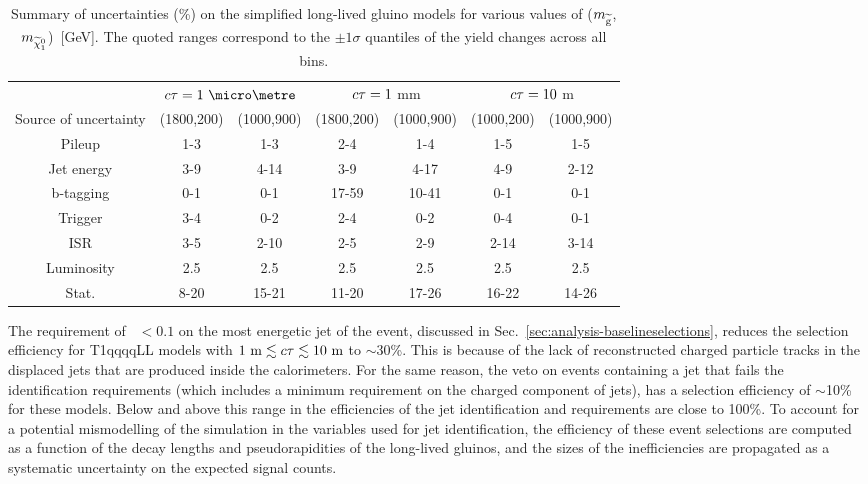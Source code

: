 \begin{table}[t]
\centering
\footnotesize
\begin{tabular}{c|cc|cc|cc}
\hline
& \multicolumn{2}{c|}{$\ctau=1~\micro\metre$} & \multicolumn{2}{c|}{$c\tau=1$ 
mm} & \multicolumn{2}{c}{$c\tau=10$ m} \\
Source of uncertainty & (1800,200) & (1000,900) & (1800,200) & 
(1000,900) & (1000,200) & (1000,900) \\   
\hline
Pileup & 1-3 & 1-3 & 2-4 & 1-4 & 1-5 & 1-5 \\
Jet energy & 3-9 & 4-14 & 3-9 & 4-17 & 4-9 & 2-12 \\
b-tagging & 0-1 & 0-1 & 17-59 & 10-41 & 0-1 & 0-1 \\
Trigger & 3-4 & 0-2 & 2-4 & 0-2 & 0-4 & 0-1 \\
ISR & 3-5 & 2-10 & 2-5 & 2-9 & 2-14 & 3-14 \\
Luminosity & 2.5 & 2.5 & 2.5 & 2.5 & 2.5 & 2.5 \\
Stat. & 8-20 & 15-21 & 11-20 & 17-26 & 16-22 & 14-26 \\
\hline
\end{tabular}
\caption{Summary of uncertainties (\%) on the simplified long-lived gluino 
models for various values of ($m_{\mathrm{\widetilde{g}}}$,$m_{\widetilde{\chi}_1^0}$)~[GeV]. The 
quoted ranges correspond to the $\pm1\sigma$ quantiles of the yield changes 
across all \njnbhtmht bins.}
\label{tab:systs-signal}
\end{table}


The requirement of \chf~$<0.1$ on the most energetic jet of the event, 
discussed in Sec.~\ref{sec:analysis-baselineselections}, reduces the selection 
efficiency for T1qqqqLL models with $1~\mathrm{m} \lesssim c\tau \lesssim 
10~\mathrm{m}$ to $\sim$30\%. This is because of the lack of reconstructed 
charged particle tracks in the displaced jets that are produced inside the 
calorimeters. 
For the same reason, the veto on events containing a jet that fails the 
identification requirements (which includes a minimum requirement on the 
charged component of jets), has a selection efficiency of $\sim$10\% for these 
models.
Below and above this range in \ctau the efficiencies of the jet identification 
and \chf requirements are close to 100\%.
To account for a potential mismodelling of the simulation in the variables used 
for jet identification, the efficiency of these event selections are computed 
as a function of the decay lengths and pseudorapidities of the long-lived 
gluinos, and the sizes of the inefficiencies are propagated as a systematic 
uncertainty on the expected signal counts. 

